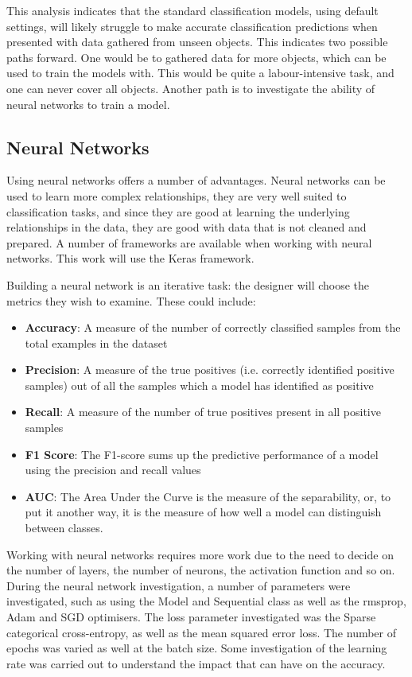 \documentclass[conference]{IEEEtran}
\begin{document}
This analysis indicates that the standard classification models, using default settings, will likely struggle to make accurate classification predictions when presented with data gathered from unseen objects. This indicates two possible paths forward. One would be to gathered data for more objects, which can be used to train the models with. This would be quite a labour-intensive task, and one can never cover all objects. Another path is to investigate the ability of neural networks to train a model. 

\subsection{Neural Networks}
Using neural networks offers a number of advantages. Neural networks can be used to learn more complex relationships, they are very well suited to classification tasks, and since they are good at learning the underlying relationships in the data, they are good with data that is not cleaned and prepared. A number of frameworks are available when working with neural networks. This work will use the Keras framework.

Building a neural network is an iterative task: the designer will choose the metrics they wish to examine. These could include:

\begin{itemize}
    \item \textbf{Accuracy}: A measure of the number of correctly classified samples from the total examples in the dataset
    \item \textbf{Precision}: A measure of the true positives (i.e. correctly identified positive samples) out of all the samples which a model has identified as positive
    \item \textbf{Recall}: A measure of the number of true positives present in all positive samples
    \item \textbf{F1 Score}: The F1-score sums up the predictive performance of a model using the precision and recall values
    \item \textbf{AUC}: The Area Under the Curve is the measure of the separability, or, to put it another way, it is the measure of how well a model can distinguish between classes.
\end{itemize}

Working with neural networks requires more work due to the need to decide on the number of layers, the number of neurons, the activation function and so on. During the neural network investigation, a number of parameters were investigated, such as using the Model and Sequential class as well as the rmsprop, Adam and SGD optimisers. The loss parameter investigated was the Sparse categorical cross-entropy, as well as the mean squared error loss. The number of epochs was varied as well at the batch size. Some investigation of the learning rate was carried out to understand the impact that can have on the accuracy. 
\end{document}
